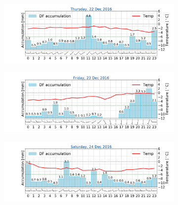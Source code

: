 \begin{figure}\ContinuedFloat
	\centering
	\begin{subfigure}[b]{0.49\textwidth}
		\includegraphics[trim={4.9cm 1.cm 1.5cm 1cm},clip,
		width=\textwidth]{./fig_weathermast/T_P_U_20161222}
		\caption{}\label{fig:TPU22}
	\end{subfigure}
	\hfill
	\begin{subfigure}[b]{0.49\textwidth}
		\includegraphics[trim={4.9cm 1.cm 1.5cm 1cm},clip,
		width=\textwidth]{./fig_weathermast/T_P_U_20161223}
		\caption{}\label{fig:TPU23}
	\end{subfigure}
	\begin{subfigure}[b]{0.49\textwidth}
		\includegraphics[trim={4.9cm 1.cm 1.5cm 1cm},clip,
		width=\textwidth]{./fig_weathermast/T_P_U_20161224}
		\caption{}\label{fig:TPU24}
	\end{subfigure}
	\hfill
	\begin{subfigure}[b]{0.49\textwidth}

\end{subfigure}
\end{figure}
